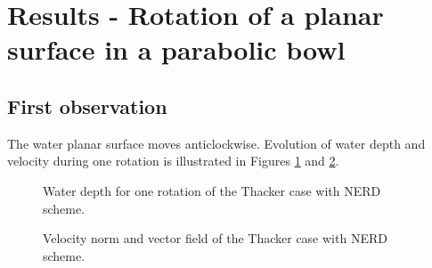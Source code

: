 \section{Results - Rotation of a planar surface in a parabolic bowl}

\subsection{First observation}

The water planar surface moves anticlockwise.
Evolution of water depth and velocity during one rotation is illustrated in
Figures \ref{fig:thacker:WDTime} and \ref{fig:thacker:VelocityTime}.

\begin{figure}[h!]
\begin{minipage}[t]{0.5\textwidth}
 \centering
\end{minipage}
\begin{minipage}[t]{0.5\textwidth}
 \centering
\end{minipage}
\begin{minipage}[t]{0.5\textwidth}
 \centering
\end{minipage}
\begin{minipage}[t]{0.5\textwidth}
 \centering
\end{minipage}
  \caption{Water depth for one rotation of the Thacker case with NERD scheme.}
  \label{fig:thacker:WDTime}
\end{figure}

\begin{figure}[H]
\begin{minipage}[t]{0.5\textwidth}
 \centering
\end{minipage}
\begin{minipage}[t]{0.5\textwidth}
 \centering
\end{minipage}
\begin{minipage}[t]{0.5\textwidth}
 \centering
\end{minipage}
\begin{minipage}[t]{0.5\textwidth}
 \centering
\end{minipage}
  \caption{Velocity norm and vector field of the Thacker case with NERD scheme.}
  \label{fig:thacker:VelocityTime}
\end{figure}

